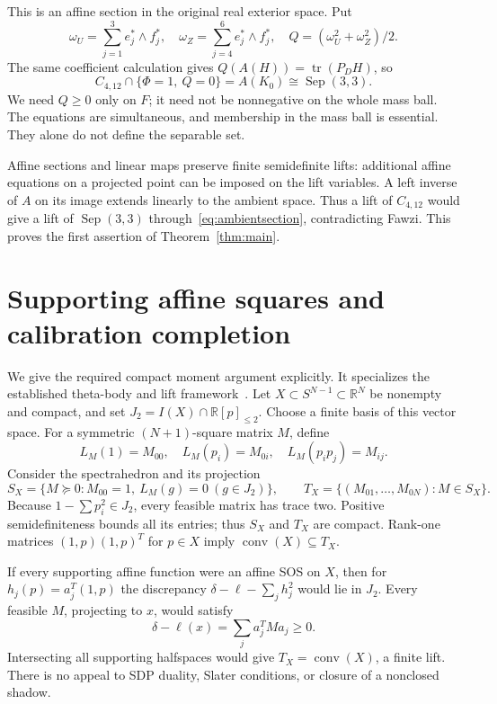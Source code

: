 \documentclass[11pt]{article}
\newcommand{\conv}{\operatorname{conv}}
\newcommand{\tr}{\operatorname{tr}}
\newcommand{\Sep}{\operatorname{Sep}}
\begin{document}
This is an affine section in the original real exterior space. Put
\[
 \omega_U=\sum_{j=1}^3e_j^*\wedge f_j^*,\quad
 \omega_Z=\sum_{j=4}^6e_j^*\wedge f_j^*,\quad
 Q=(\omega_U^2+\omega_Z^2)/2.
\]
The same coefficient calculation gives $Q(A(H))=\tr(P_DH)$, so
\begin{equation}\label{eq:ambientsection}
 C_{4,12}\cap\{\Phi=1,\ Q=0\}=A(K_0)\cong\Sep(3,3).
\end{equation}
We need $Q\geq0$ only on $F$; it need not be nonnegative on the whole
mass ball. The equations are simultaneous, and membership in the mass
ball is essential. They alone do not define the separable set.

Affine sections and linear maps preserve finite semidefinite lifts:
additional affine equations on a projected point can be imposed on the
lift variables. A left inverse of $A$ on its image extends linearly to
the ambient space. Thus a lift of $C_{4,12}$ would give a lift of
$\Sep(3,3)$ through~\eqref{eq:ambientsection}, contradicting Fawzi.
This proves the first assertion of Theorem~\ref{thm:main}.

\section{Supporting affine squares and calibration completion}
We give the required compact moment argument explicitly. It specializes
the established theta-body and lift framework~\cite{theta,lifts,survey}.
Let $X\subset S^{N-1}\subset\mathbb R^N$ be nonempty and compact, and set
$J_2=I(X)\cap\mathbb R[p]_{\leq2}$. Choose a finite basis of this vector
space. For a symmetric $(N+1)$-square matrix $M$, define
\[
 L_M(1)=M_{00},\quad L_M(p_i)=M_{0i},\quad L_M(p_ip_j)=M_{ij}.
\]
Consider the spectrahedron and its projection
\[
 S_X=\{M\succeq0:M_{00}=1,\ L_M(g)=0\ (g\in J_2)\},\qquad
 T_X=\{(M_{01},\ldots,M_{0N}):M\in S_X\}.
\]
Because $1-\sum p_i^2\in J_2$, every feasible matrix has trace two.
Positive semidefiniteness bounds all its entries; thus $S_X$ and $T_X$
are compact. Rank-one matrices $(1,p)(1,p)^T$ for $p\in X$ imply
$\conv(X)\subseteq T_X$.

If every supporting affine function were an affine SOS on $X$, then
for $h_j(p)=a_j^T(1,p)$ the discrepancy
$\delta-\ell-\sum_jh_j^2$ would lie in $J_2$. Every feasible $M$, projecting
to $x$, would satisfy
\[
 \delta-\ell(x)=\sum_j a_j^TMa_j\geq0.
\]
Intersecting all supporting halfspaces would give $T_X=\conv(X)$,
a finite lift. There is no appeal to SDP duality, Slater conditions,
or closure of a nonclosed shadow.
\end{document}

